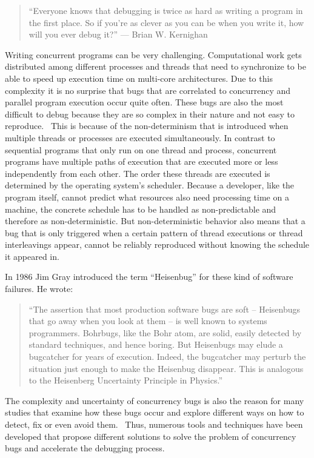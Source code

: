 \documentclass[conference]{IEEEtran}
\begin{document}
\begin{quote}
``Everyone knows that debugging is twice as hard as writing a program in the first place. So if you're as clever as you can be when you write it, how will you ever debug it?'' --- Brian W. Kernighan\cite{kernighan1974elements}
\end{quote}

Writing concurrent programs can be very challenging.
Computational work gets distributed among different processes and threads that need to synchronize to be able to speed up execution time on multi-core architectures.
Due to this complexity it is no surprise that bugs that are correlated to concurrency and parallel program execution occur quite often.
These bugs are also the most difficult to debug because they are so complex in their nature and not easy to reproduce.~\cite{tu2019go}
This is because of the non-determinism that is introduced when multiple threads or processes are executed simultaneously.
In contrast to sequential programs that only run on one thread and process, concurrent programs have multiple paths of execution that are executed more or less independently from each other.
The order these threads are executed is determined by the operating system's scheduler.
Because a developer, like the program itself, cannot predict what resources also need processing time on a machine, the concrete schedule has to be handled as non-predictable and therefore as non-deterministic.
But non-deterministic behavior also means that a bug that is only triggered when a certain pattern of thread executions or thread interleavings appear, cannot be reliably reproduced without knowing the schedule it appeared in.

In 1986 Jim Gray introduced the term ``Heisenbug'' for these kind of software failures.
He wrote:

\begin{quote}
``The assertion that most production software bugs are soft -- Heisenbugs that go away when you look at them -- is well known to systems programmers. Bohrbugs, like the Bohr atom, are solid, easily detected by standard techniques, and hence boring. But Heisenbugs may elude a bugcatcher for years of execution. Indeed, the bugcatcher may perturb the situation just enough to make the Heisenbug disappear. This is analogous to the Heisenberg Uncertainty Principle in Physics.''\cite{gray1986computers}
\end{quote}

The complexity and uncertainty of concurrency bugs is also the reason for many studies that examine how these bugs occur and explore different ways on how to detect, fix or even avoid them.~\cite{tu2019go}
Thus, numerous tools and techniques have been developed that propose different solutions to solve the problem of concurrency bugs and accelerate the debugging process.
\end{document}
